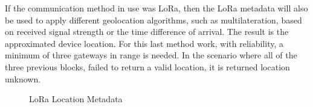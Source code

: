 
If the communication method in use was LoRa, then the LoRa metadata will also be used to apply different geolocation algorithms, such as multilateration, based on received signal strength or the time  difference of arrival. The result is the approximated device location. For this last method work, with reliability, a minimum of three gateways in range is needed. In the scenario where all of the three previous blocks, failed to  return a valid location, it is returned location unknown.


\begin{figure}[htbp]
  \centering
  \caption{LoRa Location Metadata}
  \label{fig:LoRa_Metadata}
\end{figure}


\newpage

